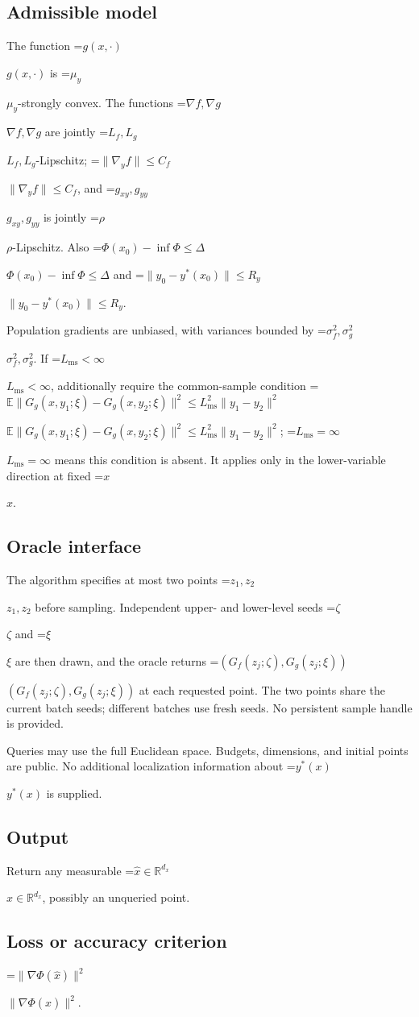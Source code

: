 \documentclass[10pt,a4paper]{article}
\newcommand{\AtlasMath}[1]{\par\begingroup\centering\setbox0=\hbox{$\displaystyle #1$}\ifdim\wd0>1.4\linewidth\typeout{ATLAS WIDE FORMULA: \the\wd0}\fi\ifdim\wd0>\linewidth\resizebox{\linewidth}{!}{\box0}\else\box0\fi\par\endgroup}
\newcommand{\AtlasInlineMath}[1]{\begingroup\setbox0=\hbox{$#1$}\ifdim\wd0>.4\linewidth\endgroup\AtlasMath{#1}\else\endgroup$#1$\fi}
\begin{document}
\subsection{Admissible model}
The function \AtlasInlineMath{g(x,\cdot)} is \AtlasInlineMath{\mu_y}-strongly convex. The functions \AtlasInlineMath{\nabla f,\nabla g} are jointly \AtlasInlineMath{L_f,L_g}-Lipschitz; \AtlasInlineMath{\|\nabla_yf\|\le C_f}, and \AtlasInlineMath{g_{xy},g_{yy}} is jointly \AtlasInlineMath{\rho}-Lipschitz. Also \AtlasInlineMath{\Phi(x_0)-\inf\Phi\le\Delta} and \AtlasInlineMath{\|y_0-y^*(x_0)\|\le R_y}.

Population gradients are unbiased, with variances bounded by \AtlasInlineMath{\sigma_f^2,\sigma_g^2}. If \AtlasInlineMath{L_{\mathrm{ms}}<\infty}, additionally require the common-sample condition \AtlasInlineMath{\mathbb{E}\|G_g(x,y_1;\xi)-G_g(x,y_2;\xi)\|^2\le L_{\mathrm{ms}}^2\|y_1-y_2\|^2}; \AtlasInlineMath{L_{\mathrm{ms}}=\infty} means this condition is absent. It applies only in the lower-variable direction at fixed \AtlasInlineMath{x}.

\subsection{Oracle interface}
The algorithm specifies at most two points \AtlasInlineMath{z_1,z_2} before sampling. Independent upper- and lower-level seeds \AtlasInlineMath{\zeta} and \AtlasInlineMath{\xi} are then drawn, and the oracle returns \AtlasInlineMath{(G_f(z_j;\zeta),G_g(z_j;\xi))} at each requested point. The two points share the current batch seeds; different batches use fresh seeds. No persistent sample handle is provided.

Queries may use the full Euclidean space. Budgets, dimensions, and initial points are public. No additional localization information about \AtlasInlineMath{y^*(x)} is supplied.

\subsection{Output}
Return any measurable \AtlasInlineMath{\widehat{x}\in\mathbb{R}^{d_x}}, possibly an unqueried point.

\subsection{Loss or accuracy criterion}
\AtlasInlineMath{\|\nabla\Phi(\widehat{x})\|^2}.
\end{document}

